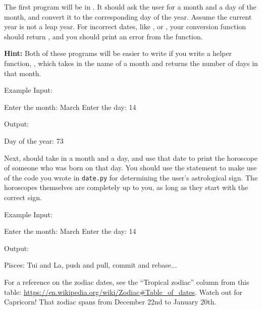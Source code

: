 \documentclass[11pt]{cselabheader}
\begin{document}
{{\begin{ex}
  The first program will be in . It should ask the user for a month and
  a day of the month, and convert it to the corresponding day of the year.
  Assume the current year is not a leap year. For incorrect dates,
  like ,  or , your
  conversion function should return , and you should print an
  error from the  function.

  \textbf{Hint:} Both of these programs will be easier to write if you write a
  helper function, , which takes in the name of a
  month and returns the number of days in that month.

  Example Input:

  \begin{verbatimcode}
Enter the month: March
Enter the day: 14
  \end{verbatimcode}

  Output:

  \begin{verbatimcode}
Day of the year: 73
  \end{verbatimcode}

  Next,  should take in a month and a day, and use that date
  to print the horoscope of someone who was born on that day. You should use the
   statement to make use of the code you wrote in
  \texttt{date.py} for determining the user's astrological sign. The
  horoscopes themselves are completely up to you, as long as they start with the
  correct sign.

  Example Input:

  \begin{verbatimcode}
Enter the month: March
Enter the day: 14
  \end{verbatimcode}

  Output:

  \begin{verbatimcode}
Pisces: Tui and La, push and pull, commit and rebase...
  \end{verbatimcode}

  For a reference on the zodiac dates, see the ``Tropical zodiac'' column from
  this table: \url{https://en.wikipedia.org/wiki/Zodiac#Table_of_dates}. Watch
  out for Capricorn! That zodiac spans from December 22nd to January 20th.

\end{ex}

}}
\end{document}
